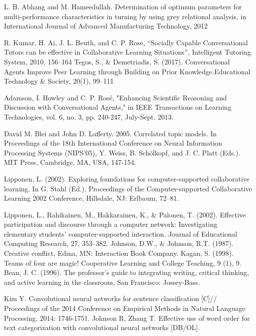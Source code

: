 \documentclass[letterpaper%
, twoside%
, 12pt%
,these%
, english%
,creativecommons,hyperref, withAlgo2e %
]{thETS}
\begin{document}
\begin{thebibliography}{01}
		
L. B. Abhang  and M. Hameedullah. Determination of optimum parameters for multi-performance characteristics in turning by using grey relational analysis, in International Journal of Advanced Manufacturing Technology, 2012



 R. Kumar, H. Ai, J. L. Beuth, and C. P. Rose, “Socially Capable Conversational Tutors can be effective in Collaborative Learning Situations”, Intelligent Tutoring System, 2010, 156--164
 Tegos,  S.,  \&  Demetriadis,  S.  (2017). Conversational  Agents  Improve Peer  Learning  through  Building  on Prior  Knowledge.Educational Technology \& Society, 20(1), 99–111


 Adamson, I. Howley and C. P. Rosé, "Enhancing Scientific Reasoning and Discussion with Conversational Agents," in IEEE Transactions on Learning Technologies, vol. 6, no. 3, pp. 240-247, July-Sept. 2013.



David M. Blei and John D. Lafferty. 2005. Correlated topic models. In Proceedings of the 18th International Conference on Neural Information Processing Systems (NIPS'05), Y. Weiss, B. Schölkopf, and J. C. Platt (Eds.). MIT Press, Cambridge, MA, USA, 147-154.

Lipponen, L. (2002). Exploring foundations for computer-supported collaborative learning. In G. Stahl (Ed.),
Proceedings of the Computer-supported Collaborative Learning 2002 Conference, Hillsdale, NJ: Erlbaum, 72--81.

	Lipponen, L., Rahikainen, M., Hakkarainen, K., \& Palonen, T. (2002). Effective participation and discourse through
a computer network: Investigating elementary students' computer-supported interaction. Journal of Educational
Computing Research, 27, 353--382. 
Johnson, D.W., \& Johnson, R.T. (1987). Creative conflict, Edina, MN: Interaction Book Company. 
Kagan, S. (1998). Teams of four are magic! Cooperative Learning and College Teaching, 9 (1), 9. 
Bean, J. C. (1996). The professor’s guide to integrating writing, critical thinking, and active learning in the
classroom, San Francisco: Jossey-Bass. 

 Kim Y. Convolutional neural networks for sentence classification [C]//
Proceedings of the 2014 Conference on Empirical Methods in Natural
Language Processing. 2014: 1746-1751.
 Johnson R, Zhang T. Effective use of word order for text categorization
with convolutional neural networks [DB/OL]. 



\end{thebibliography}
\end{document}
